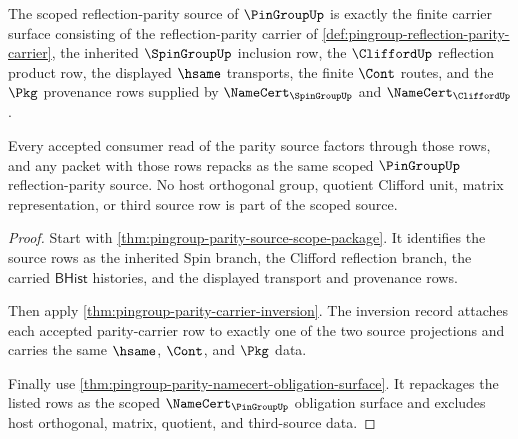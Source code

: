 \begin{theorem}
\label{thm:pingroup-scoped-reflection-parity-source}
The scoped reflection-parity source of $\PinGroupUp$ is exactly the finite
carrier surface consisting of the reflection-parity carrier of
\autoref{def:pingroup-reflection-parity-carrier}, the inherited
$\SpinGroupUp$ inclusion row, the $\CliffordUp$ reflection product row, the
displayed $\hsame$ transports, the finite $\Cont$ routes, and the $\Pkg$
provenance rows supplied by $\NameCert_{\SpinGroupUp}$ and
$\NameCert_{\CliffordUp}$.

Every accepted consumer read of the parity source factors through those rows,
and any packet with those rows repacks as the same scoped $\PinGroupUp$
reflection-parity source. No host orthogonal group, quotient Clifford unit,
matrix representation, or third source row is part of the scoped source.
\end{theorem}
\begin{proof}
Start with \autoref{thm:pingroup-parity-source-scope-package}. It identifies
the source rows as the inherited Spin branch, the Clifford reflection branch,
the carried $\mathsf{BHist}$ histories, and the displayed transport and
provenance rows.

Then apply \autoref{thm:pingroup-parity-carrier-inversion}. The inversion
record attaches each accepted parity-carrier row to exactly one of the two
source projections and carries the same $\hsame$, $\Cont$, and $\Pkg$ data.

Finally use \autoref{thm:pingroup-parity-namecert-obligation-surface}. It
repackages the listed rows as the scoped $\NameCert_{\PinGroupUp}$ obligation
surface and excludes host orthogonal, matrix, quotient, and third-source data.
\end{proof}

